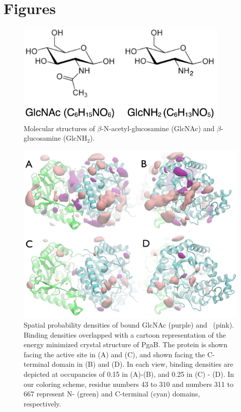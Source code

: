 \section{Figures}

\begin{figure}[htbp]
\centering
\includegraphics[width=4in]{figures/results4/sugar_structures.pdf}
\caption[Molecular structures of GlcNAc and GlcNH$_2$]{Molecular structures of $\beta$-N-acetyl-glucosamine (GlcNAc) and $\beta$-glucosamine (GlcNH$_2$).}
\label{fig:nag}
\end{figure}



\begin{figure}[htbp]
\centering
\includegraphics[width=6.25in]{figures/results4/glcnac_glucosamine_merged_sdf.pdf}
\caption[Spatial probability densities of bound GlcNAc (purple) and \glucosamine]{Spatial probability densities of bound GlcNAc (purple) and \glucosamine\ (pink).  Binding densities overlapped with a cartoon representation of the energy minimized crystal structure of PgaB.  The protein is shown facing the active site in (A) and (C), and shown facing the C-terminal domain in (B) and (D). In each view, binding densities are depicted at occupancies of 0.15 in (A)-(B), and 0.25 in (C) - (D). In our coloring scheme, residue numbers 43 to 310 and numbers 311 to 667 represent N- (green) and C-terminal (cyan) domains, respectively.}
\label{fig:sdf}
\end{figure}

